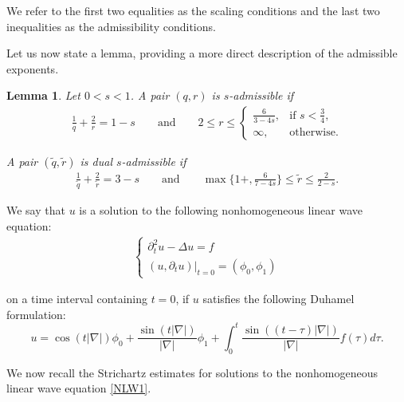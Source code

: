 \documentclass[letterpaper, 11pt,  reqno]{amsart}
\newtheorem{lemma}[theorem]{Lemma}
\newcommand{\1}{\hspace{0.5mm}\text{I}\hspace{0.5mm}}
\newcommand{\noi}{\noindent}
\newcommand{\nb}{\nabla}
\newcommand{\wt}{\widetilde}
\newcommand{\dt}{\partial_t}
\numberwithin{equation}{section}
\numberwithin{theorem}{section}
\begin{document}
\noi
We refer to the first two equalities as the scaling conditions
and the last two inequalities as the admissibility conditions.

Let us now state a lemma, providing a more direct description of the admissible exponents.

\begin{lemma} \label{LEM:pair} 
Let $0< s<1$.
A pair $(q,r)$ is $s$-admissible if 
\begin{align}
  \frac{1}{q} + \frac 2r  = 1-  s 
\qquad  
\text{and} \qquad
2\le r \le 
\begin{cases}
 \frac6{3-4s}, & \text{if } s < \frac34, \\ 
\infty, & \text{otherwise}. 
\end{cases}
\label{admis2}
\end{align}


\noi
A pair $(\wt  q,\wt  r)$ is dual $s$-admissible if 
\begin{align} 
\frac1{\wt q} + \frac2{\wt r} = 3 - s 
\qquad  
\text{and} \qquad
\max\bigg\{1+, \frac6{7-4s} \bigg\}  \le   \wt r \le \frac2{2-s}. 
\label{admis3}
\end{align}



\end{lemma} 



We say that  $u$ is a solution to the following nonhomogeneous linear wave equation:
\begin{align}
\begin{cases}
\dt^2 u -\Delta u = f \\
( u, \dt u) |_{t = 0}=(\phi_0,  \phi_1) 
\end{cases}
\label{NLW1}
\end{align}


\noi
on a time interval containing $t= 0$, 
if $u$ satisfies the following Duhamel formulation:
\[ u =  \cos (t|\nb|) \phi_0 +   \frac{\sin (t|\nb|)}{ |\nb|} \phi_1 
+ \int_0^t  \frac{\sin ((t-\tau)|\nb|)}{ |\nb|}   f(\tau) d\tau . \]  

\noi
We now recall the  Strichartz estimates
for solutions to the nonhomogeneous linear wave equation
\eqref{NLW1}.
\end{document}
